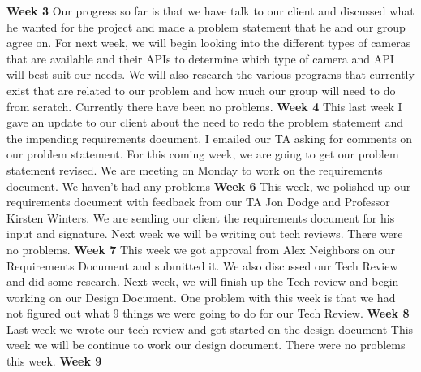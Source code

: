 \documentclass[onecolumn, draftclsnofoot,10pt, compsoc]{IEEEtran}
\begin{document}
\textbf{Week 3}
\newline
Our progress so far is that we have talk to our client and discussed what he wanted for the project and made a problem statement that he and our group agree on.\newline
For next week, we will begin looking into the different types of cameras that are available and their APIs to determine which type of camera and API will best suit our needs. We will also research the various programs that currently exist that are related to our problem and how much our group will need to do from scratch.
Currently there have been no problems.
\newline
\textbf{Week 4}
\newline
This last week I gave an update to our client about the need to redo the problem statement and the impending requirements document. I emailed our TA asking for comments on our problem statement.
\newline
For this coming week, we are going to get our problem statement revised. We are meeting on Monday to work on the requirements document.
\newline
We haven't had any problems
\newline
\textbf{Week 6}
\newline
This week, we polished up our requirements document with feedback from our TA Jon Dodge and Professor Kirsten Winters. We are sending our client the requirements document for his input and signature. Next week we will be writing out tech reviews. There were no problems.
\newline
\textbf{Week 7}
\newline
This week we got approval from Alex Neighbors on our Requirements Document and submitted it. We also discussed our Tech Review and did some research.
\newline
Next week, we will finish up the Tech review and begin working on our Design Document.
\newline
One problem with this week is that we had not figured out what 9 things we were going to do for our Tech Review.
\newline
\textbf{Week 8}
\newline
Last week we wrote our tech review and got started on the design document
\newline
This week we will be continue to work our design document.
\newline
There were no problems this week.
\newline
\textbf{Week 9}
\newline
\end{document}
